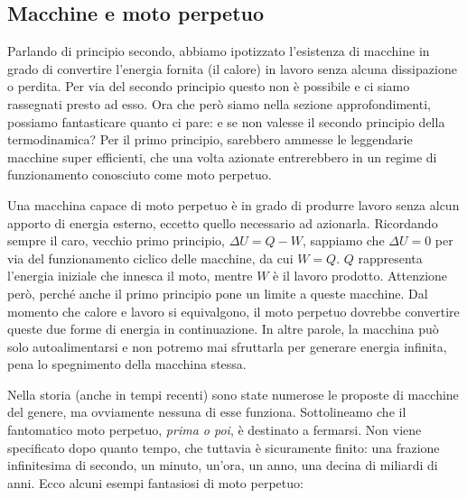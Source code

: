 \subsection{Macchine e moto perpetuo}
Parlando di principio secondo, abbiamo ipotizzato l'esistenza di macchine
in grado di convertire l'energia fornita (il calore) in lavoro senza alcuna
dissipazione o perdita. Per via del secondo principio questo non è possibile
e ci siamo rassegnati presto ad esso. Ora che però siamo nella sezione approfondimenti,
possiamo fantasticare quanto ci pare: e se non valesse il secondo principio
della termodinamica? Per il primo principio, sarebbero ammesse le leggendarie
macchine super efficienti, che una volta azionate entrerebbero in un regime
di funzionamento conosciuto come moto perpetuo.

Una macchina capace di moto
perpetuo è in grado di produrre lavoro senza alcun apporto di energia esterno,
eccetto quello necessario ad azionarla. Ricordando sempre il caro, vecchio primo
principio, $\Delta U = Q - W$, sappiamo che $\Delta U = 0$ per via del
funzionamento ciclico delle macchine, da cui $W = Q$. $Q$ rappresenta l'energia
iniziale che innesca il moto, mentre $W$ è il lavoro prodotto. Attenzione però,
perché anche il primo principio pone un limite a queste macchine.
Dal momento che calore e lavoro si equivalgono, il moto perpetuo dovrebbe
convertire queste due forme di energia in continuazione. In altre parole,
la macchina può solo autoalimentarsi e non potremo mai sfruttarla per generare
energia infinita, pena lo spegnimento della macchina stessa.

Nella storia (anche in tempi recenti) sono state numerose le proposte
di macchine del genere, ma ovviamente nessuna di esse funziona.
Sottolineamo che il fantomatico moto perpetuo, \emph{prima o poi}, è
destinato a fermarsi. Non viene specificato dopo quanto tempo, che tuttavia
è sicuramente finito: una frazione infinitesima di secondo, un minuto,
un'ora, un anno, una decina di miliardi di anni.
Ecco alcuni esempi fantasiosi di moto perpetuo:

